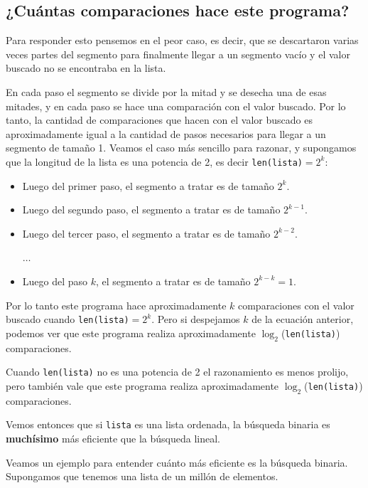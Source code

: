 \subsection*{¿Cuántas comparaciones hace este programa?}

Para responder esto pensemos en el peor caso, es decir, que se descartaron
varias veces partes del segmento para finalmente llegar a un segmento vacío y
el valor buscado no se encontraba en la lista.

En cada paso el segmento se divide por la mitad y se desecha una de esas
mitades, y en cada paso se hace una comparación con el valor buscado. Por lo
tanto, la cantidad de comparaciones que hacen con el valor buscado es
aproximadamente igual a la cantidad de pasos necesarios para llegar a un
segmento de tamaño 1.
Veamos el caso más sencillo para razonar, y supongamos que la longitud de la
lista es una potencia de 2, es decir \lstinline+len(lista)+$= 2^k$:

\begin{itemize}
\item Luego del primer paso, el segmento a tratar es de tamaño $2^k$.
\item Luego del segundo paso, el segmento a tratar es de tamaño $2^{k-1}$.
\item Luego del tercer paso, el segmento a tratar es de tamaño $2^{k-2}$.

$\ldots$

\item Luego del paso $k$, el segmento a tratar es de tamaño $2^{k-k}=1$.
\end{itemize}

Por lo tanto este programa hace aproximadamente $k$ comparaciones con el valor
buscado cuando \lstinline+len(lista)+$= 2^k$.
Pero si despejamos $k$ de la ecuación anterior, podemos ver que este programa
realiza aproximadamente $\log_2$(\lstinline+len(lista)+) comparaciones.

Cuando \lstinline+len(lista)+ no es una potencia de 2 el razonamiento es menos
prolijo, pero también vale que este programa realiza aproximadamente
$\log_2$(\lstinline+len(lista)+) comparaciones.

\begin{observacion}
Vemos entonces que si \lstinline!lista! es una lista ordenada, la búsqueda binaria es
{\bf muchísimo} más eficiente que la búsqueda lineal.
\end{observacion}

Veamos un ejemplo para entender cuánto más eficiente es la búsqueda binaria.
Supongamos que tenemos una lista de un millón de elementos.

